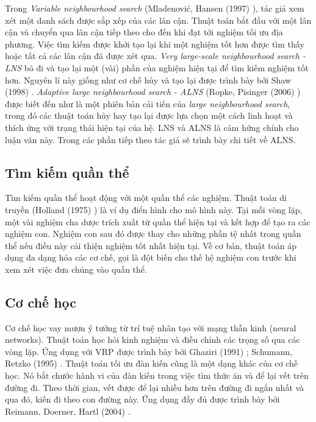 Trong \textit{Variable neighbourhood search} (Mladenović, Hansen (1997) \cite{mladenovic1997variable}), tác giả xem xét một danh sách được sắp xếp của các lân cận. Thuật toán bắt đầu với một lân cận và chuyển qua lân cận tiếp theo cho đến khi đạt tới nghiệm tối ưu địa phương. Việc tìm kiếm được khởi tạo lại khi một nghiệm tốt hơn được tìm thấy hoặc tất cả các lân cận đã được xét qua. \textit{Very large-scale neighbourhood search - LNS} bỏ đi và tạo lại một (vài) phần của nghiệm hiện tại để tìm kiếm nghiệm tốt hơn. Nguyên lí này giống như cơ chế hủy và tạo lại được trình bày bởi Shaw (1998) \cite{shaw1998using}. \textit{Adaptive large neighbourhood search - ALNS} (Ropke, Pisinger (2006) \cite{ropke2006adaptive}) được biết đến như là một phiên bản cải tiến của \textit{large neighbourhood search}, trong đó các thuật toán hủy hay tạo lại được lựa chọn một cách linh hoạt và thích ứng với trạng thái hiện tại của hệ. LNS và ALNS là cảm hứng chính cho luận văn này. Trong các phần tiếp theo tác giả sẽ trình bày chi tiết về ALNS.

\subsection{Tìm kiếm quần thể}

Tìm kiếm quần thể hoạt động với một quần thể các nghiệm. Thuật toán di truyền (Holland (1975) \cite{holland1975adaptation}) là ví dụ điển hình cho mô hình này. Tại mỗi vòng lặp, một vài nghiệm cha dược trích xuất từ quần thể hiện tại và kết hợp để tạo ra các nghiệm con. Nghiệm con sau đó được thay cho những phần tệ nhất trong quần thể nếu điều này cải thiện nghiệm tốt nhất hiện tại. Về cơ bản, thuật toán áp dụng đa dạng hóa các cơ chế, gọi là đột biến cho thế hệ nghiệm con trước khi xem xét việc đưa chúng vào quần thể.


\subsection{Cơ chế học}

Cơ chế học vay mượn ý tưởng từ trí tuệ nhân tạo với mạng thần kinh (neural networks). Thuật toán học hỏi kinh nghiệm và điều chỉnh các trọng số qua các vòng lặp. Ứng dụng với VRP được trình bày bởi Ghaziri (1991) \cite{ghaziri1991solving}; Schumann, Retzko (1995) \cite{schumann1995self}. Thuật toán tối ưu đàn kiến cũng là một dạng khác của cơ chế học. Nó bắt chước hành vi của đàn kiến trong việc tìm thức ăn và để lại vết trên đường đi. Theo thời gian, vết được để lại nhiều hơn trên đường đi ngắn nhất và qua đó, kiến đi theo con đường này. Ứng dụng đầy đủ được trình bày bởi Reimann, Doerner, Hartl (2004) \cite{reimann2004d}.


